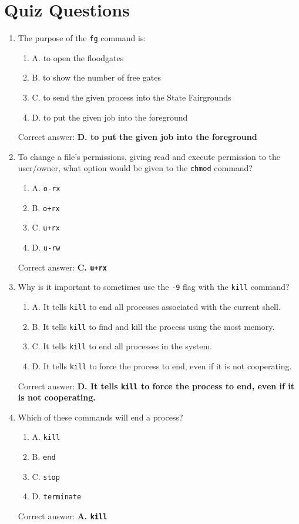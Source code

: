 \documentclass{article}
\begin{document}
\section*{Quiz Questions}

\begin{enumerate}
  \item The purpose of the \texttt{fg} command is:
  \begin{enumerate}
    \item A. to open the floodgates
    \item B. to show the number of free gates
    \item C. to send the given process into the State Fairgrounds
    \item D. to put the given job into the foreground
  \end{enumerate}
  Correct answer: \textbf{D. to put the given job into the foreground}
  
  \item To change a file's permissions, giving read and execute permission to the user/owner, what option would be given to the \texttt{chmod} command?
  \begin{enumerate}
    \item A. \texttt{o-rx}
    \item B. \texttt{o+rx}
    \item C. \texttt{u+rx}
    \item D. \texttt{u-rw}
  \end{enumerate}
  Correct answer: \textbf{C. \texttt{u+rx}}
  
  \item Why is it important to sometimes use the \texttt{-9} flag with the \texttt{kill} command?
  \begin{enumerate}
    \item A. It tells \texttt{kill} to end all processes associated with the current shell.
    \item B. It tells \texttt{kill} to find and kill the process using the most memory.
    \item C. It tells \texttt{kill} to end all processes in the system.
    \item D. It tells \texttt{kill} to force the process to end, even if it is not cooperating.
  \end{enumerate}
  Correct answer: \textbf{D. It tells \texttt{kill} to force the process to end, even if it is not cooperating.}
  
  \item Which of these commands will end a process?
  \begin{enumerate}
    \item A. \texttt{kill}
    \item B. \texttt{end}
    \item C. \texttt{stop}
    \item D. \texttt{terminate}
  \end{enumerate}
  Correct answer: \textbf{A. \texttt{kill}}
  

\end{enumerate}
\end{document}
